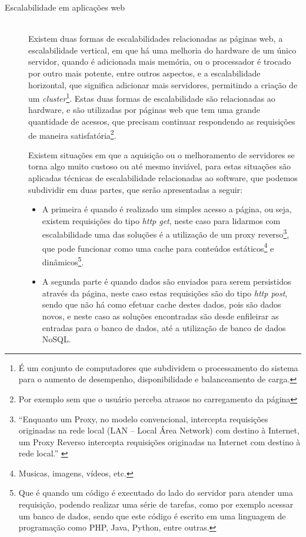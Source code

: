 \begin{description}
\item[Escalabilidade em aplicações web] \hfill \\
Existem duas formas de escalabilidades relacionadas as páginas web, a escalabilidade vertical, em que há uma melhoria do hardware de um único servidor, quando é adicionada mais memória, ou o processador é trocado por outro mais potente, entre outros aspectos, e a escalabilidade horizontal, que significa adicionar mais servidores, permitindo a criação de um \textit{cluster}\footnote{É um conjunto de computadores que subdividem o processamento do sistema para o aumento de desempenho, disponibilidade e balanceamento de carga.}. Estas duas formas de escalabilidade são relacionadas ao hardware, e são utilizadas por páginas web que tem uma grande quantidade de acessos, que precisam continuar respondendo as requisições de maneira satisfatória\footnote{Por exemplo sem que o usuário perceba atrasos no carregamento da página}.  

Existem  situações em que a aquisição ou o melhoramento de servidores se torna algo muito custoso ou até mesmo inviável, para estas situações são aplicadas técnicas de escalabilidade relacionadas ao software, que podemos subdividir em duas partes, que serão apresentadas a seguir:

\begin{itemize}
  \item A primeira é quando é realizado um simples acesso a página, ou seja, existem requisições do tipo \textit{http get}, neste caso para lidarmos com escalabilidade uma das soluções é a utilização de um proxy reverso\footnote{``Enquanto um Proxy, no modelo convencional, intercepta requisições originadas na rede local (LAN – Local Área Network) com destino à Internet, um Proxy Reverso intercepta requisições originadas na Internet com destino à rede local.'' \cite{proxyRev}}, que pode funcionar como uma cache para conteúdos estáticos\footnote{Musicas, imagens, vídeos, etc.} e dinâmicos\footnote{Que é quando um código é executado do lado do servidor para atender uma requisição, podendo realizar uma série de tarefas, como por exemplo acessar um banco de dados, sendo que este código é escrito em uma linguagem de programação como PHP, Java, Python, entre outras.}.

 \item A segunda parte é quando dados são enviados para serem persistidos através da página, neste caso estas requisições são do tipo \textit{http post}, sendo que não há como efetuar cache destes dados, pois são dados novos, e neste caso as soluções encontradas são desde enfileirar as entradas para o banco de dados, até a utilização de banco de dados NoSQL.
\end{itemize}

\end{description}

